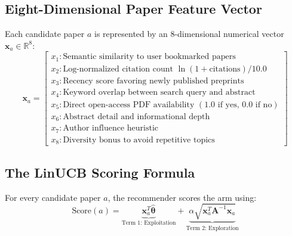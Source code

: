 \documentclass[11pt,a4paper]{article}
\begin{document}
\subsection{Eight-Dimensional Paper Feature Vector}
Each candidate paper $a$ is represented by an 8-dimensional numerical vector $\mathbf{x}_a \in \mathbb{R}^8$:
\begin{equation}
\mathbf{x}_a = \begin{bmatrix}
x_1: \text{Semantic similarity to user bookmarked papers} \\
x_2: \text{Log-normalized citation count } \ln(1 + \text{citations}) / 10.0 \\
x_3: \text{Recency score favoring newly published preprints} \\
x_4: \text{Keyword overlap between search query and abstract} \\
x_5: \text{Direct open-access PDF availability } (1.0 \text{ if yes, } 0.0 \text{ if no}) \\
x_6: \text{Abstract detail and informational depth} \\
x_7: \text{Author influence heuristic} \\
x_8: \text{Diversity bonus to avoid repetitive topics}
\end{bmatrix}
\end{equation}

\subsection{The LinUCB Scoring Formula}
For every candidate paper $a$, the recommender scores the arm using:
\begin{equation}
\text{Score}(a) = \underbrace{\mathbf{x}_a^T \hat{\boldsymbol{\theta}}}_{\text{Term 1: Exploitation}} + \underbrace{\alpha \sqrt{\mathbf{x}_a^T \mathbf{A}^{-1} \mathbf{x}_a}}_{\text{Term 2: Exploration}}
\end{equation}
\end{document}
